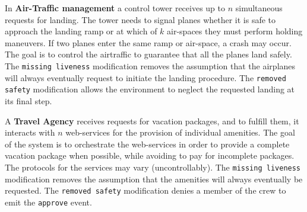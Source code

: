 \begin{description}[align=left,leftmargin=0.7cm,font=\normalfont,style=nextline,itemsep=0pt]
\item[AT] In \textbf{Air-Traffic management} a control tower receives up to $n$ simultaneous requests for landing. The tower
needs to signal planes whether it is safe to approach the
landing ramp or at which of $k$ air-spaces they must perform
holding maneuvers. If two planes enter the same ramp or
air-space, a crash may occur. The goal is to control the airtraffic to guarantee that all the planes land safely.  The \texttt{missing liveness} modification removes the assumption that the airplanes will always eventually request to initiate the landing procedure. The \texttt{removed safety} modification allows the environment to neglect the requested landing at its final step. 
\item[TA] A \textbf{Travel Agency} receives requests for
vacation packages, and to fulfill them, it interacts with $n$
web-services for the provision of individual amenities. The goal
of the system is to orchestrate the web-services in order to
provide a complete vacation package when possible, while
avoiding to pay for incomplete packages. The protocols for
the services may vary (uncontrollably). The \texttt{missing liveness} modification removes the assumption that the amenities will always eventually be requested. The \texttt{removed safety} modification denies a member of the crew to emit the \texttt{approve} event. 
\end{description}
\vspace{-1em}

